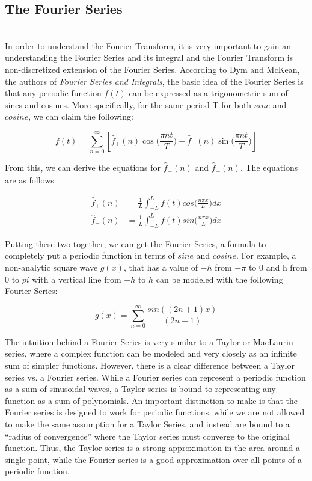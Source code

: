 \documentclass{amsproc}
\begin{document}
\subsection{The Fourier Series}

\mbox{}	\\
\indent In order to understand the Fourier Transform, it is very important to gain an understanding the Fourier Series and its integral and the Fourier Transform is non-discretized extension of the Fourier Series. According to Dym and McKean, the authors of \textit{Fourier Series and Integrals}, the basic idea of the Fourier Series is that any periodic function $f(t)$ can be expressed as a trigonometric sum of sines and cosines. More specifically, for the same period T for both $sine$ and $cosine$, we can claim the following:

$$
f(t) = \sum_{n = 0}^{\infty} [\hat f_+(n)\cos \Big(\frac{\pi n t}{T}\Big) + \hat f_-(n)\sin \Big(\frac{\pi n t}{T}\Big)]
$$

From this, we can derive the equations for $\hat f_+(n)$ and $\hat f_-(n)$. The equations are as follows \cite{Dym}

\begin{align*}
\hat f_+(n)  &= \frac{1}{L}\int_{-L}^{L} f(t) cos\Big(\frac{n\pi x}{L}\Big)dx \\
\hat f_-(n)  &= \frac{1}{L}\int_{-L}^{L} f(t) sin\Big(\frac{n\pi x}{L}\Big)dx
\end{align*}

Putting these two together, we can get the Fourier Series, a formula to completely put a periodic function in terms of $sine$ and $cosine$. For example, a non-analytic square wave $g(x)$, that has a value of $-h$ from $-\pi$ to $0$ and h from $0$ to $pi$ with a vertical line from $-h$ to $h$ can be modeled with the following Fourier Series:

$$
g(x) = \sum_{n = 0}^{\infty} \frac{sin((2n + 1)x)}{(2n + 1)}
$$

The intuition behind a Fourier Series is very similar to a Taylor or MacLaurin series, where a complex function can be modeled and very closely  as an infinite sum of simpler functions. However, there is a clear difference between a Taylor series vs. a Fourier series. While a Fourier series can represent a periodic function as a sum of sinusoidal waves, a Taylor series is bound to representing any function as a sum of polynomials. An important distinction to make is that the Fourier series is designed to work for periodic functions, while we are not allowed to make the same assumption for a Taylor Series, and instead are bound to a ``radius of convergence'' where the Taylor series must converge to the original function. Thus, the Taylor series is a strong approximation in the area around a single point, while the Fourier series is a good approximation over all points of a periodic function.
\end{document}
